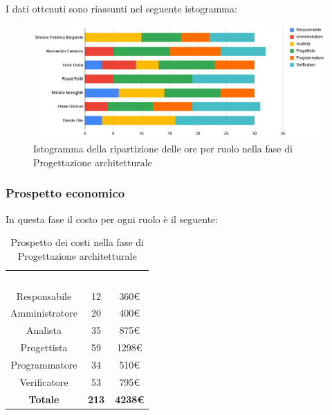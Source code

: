 I dati ottenuti sono riassunti nel seguente istogramma:
\begin{figure}[H]
\centering
\includegraphics[scale=0.60]{img/grafici/tabella_fase_prog_architetturale.png}
\caption{Istogramma della ripartizione delle ore per ruolo nella fase di Progettazione architetturale}
\end{figure}
 
\subsubsection{Prospetto economico}
In questa fase il costo per ogni ruolo è il seguente:
 
\begin{table}[H]
\centering\renewcommand{\arraystretch}{1.5}
\caption{Prospetto dei costi nella fase di Progettazione architetturale}
\vspace{0.2cm}
\begin{tabular}{ c c c }
\rowcolor{redafk}
\textcolor{white}{\textbf{Ruolo}} & \textcolor{white}{\textbf{Ore}} &
\textcolor{white}{\textbf{Costo}}  \\
Responsabile & 12 & 360€ \\
Amministratore & 20 & 400€ \\
Analista & 35 & 875€ \\
Progettista & 59 & 1298€ \\
Programmatore & 34 & 510€  \\
Verificatore & 53 & 795€  \\
\rowcolor{lastrowcolor}
\textbf{Totale} & \textbf{213} & \textbf{4238€}  \\
\end{tabular}
\end{table}
 
